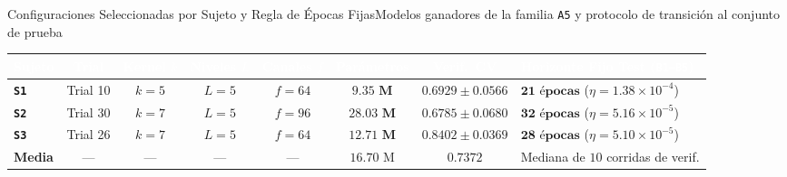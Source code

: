 \begin{frame}{Configuraciones Seleccionadas por Sujeto y Regla de \'Epocas Fijas}{Modelos ganadores de la familia \texttt{A5} y protocolo de transici\'on al conjunto de prueba \cite{rodas_valencia_tpe_ecog}}
  \scriptsize
  \centering
  \renewcommand{\arraystretch}{1.35}
  \setlength{\tabcolsep}{5.5pt}
  \begin{tabularx}{\textwidth}{@{} l c c c c c c >{\raggedright\arraybackslash}X @{}}
    \toprule
    \rowcolor{ipnDark}
    \textcolor{white}{\textbf{Sujeto}} &
    \textcolor{white}{\textbf{Trial}} &
    \textcolor{white}{\textbf{Kernel $k$}} &
    \textcolor{white}{\textbf{Niveles $L$}} &
    \textcolor{white}{\textbf{Canales $f$}} &
    \textcolor{white}{\textbf{Par\'ametros}} &
    \textcolor{white}{\textbf{Verif.\ CV}} &
    \textcolor{white}{\textbf{Horizonte Fijo Test (\texttt{B1--B5})}} \\
    \midrule
    \textbf{\texttt{S1}} & Trial 10 & $k = 5$ & $L = 5$ & $f = 64$ & $\mathbf{9.35\text{ M}}$ & $0.6929 \pm 0.0566$ & $\mathbf{21\text{ \'epocas}}$ ($\eta = 1.38\times 10^{-4}$) \\
    \rowcolor{rowHighlight}
    \textbf{\texttt{S2}} & Trial 30 & $k = 7$ & $L = 5$ & $f = 96$ & $\mathbf{28.03\text{ M}}$ & $0.6785 \pm 0.0680$ & $\mathbf{32\text{ \'epocas}}$ ($\eta = 5.16\times 10^{-5}$) \\
    \textbf{\texttt{S3}} & Trial 26 & $k = 7$ & $L = 5$ & $f = 64$ & $\mathbf{12.71\text{ M}}$ & $0.8402 \pm 0.0369$ & $\mathbf{28\text{ \'epocas}}$ ($\eta = 5.10\times 10^{-5}$) \\
    \midrule
    \rowcolor{rowLight}
    \textbf{Media} & --- & --- & --- & --- & $16.70\text{ M}$ & $\mathbf{0.7372}$ & Mediana de $10$ corridas de verif. \\
    \bottomrule
  \end{tabularx}


\end{frame}

